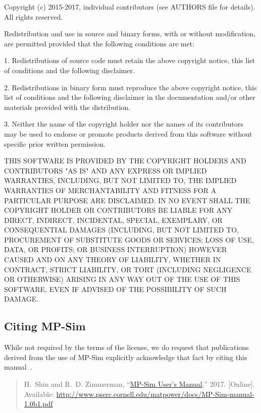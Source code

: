 \documentclass[12pt]{article}
\newcommand{\mpsim}[0]{{MP-Sim}}
\newcommand{\mpsimver}[0]{1.0b1}
\newcommand{\mpsimmanurl}[0]{http://www.pserc.cornell.edu/matpower/docs/MP-Sim-manual-\mpsimver.pdf}
\newcommand{\mpsimman}[0]{\href{\mpsimmanurl}{\mpsim{} User's Manual}}
\numberwithin{equation}{section}
\numberwithin{table}{section}
\numberwithin{figure}{section}
\begin{document}
\begin{Notice}
Copyright (c) 2015-2017, individual contributors (see AUTHORS file
for details).  All rights reserved.

Redistribution and use in source and binary forms, with or without
modification, are permitted provided that the following conditions
are met:

1. Redistributions of source code must retain the above copyright
notice, this list of conditions and the following disclaimer.

2. Redistributions in binary form must reproduce the above copyright
notice, this list of conditions and the following disclaimer in the
documentation and/or other materials provided with the distribution.

3. Neither the name of the copyright holder nor the names of its
contributors may be used to endorse or promote products derived from
this software without specific prior written permission.

THIS SOFTWARE IS PROVIDED BY THE COPYRIGHT HOLDERS AND CONTRIBUTORS
"AS IS" AND ANY EXPRESS OR IMPLIED WARRANTIES, INCLUDING, BUT NOT
LIMITED TO, THE IMPLIED WARRANTIES OF MERCHANTABILITY AND FITNESS
FOR A PARTICULAR PURPOSE ARE DISCLAIMED. IN NO EVENT SHALL THE
COPYRIGHT HOLDER OR CONTRIBUTORS BE LIABLE FOR ANY DIRECT, INDIRECT,
INCIDENTAL, SPECIAL, EXEMPLARY, OR CONSEQUENTIAL DAMAGES (INCLUDING,
BUT NOT LIMITED TO, PROCUREMENT OF SUBSTITUTE GOODS OR SERVICES;
LOSS OF USE, DATA, OR PROFITS; OR BUSINESS INTERRUPTION) HOWEVER
CAUSED AND ON ANY THEORY OF LIABILITY, WHETHER IN CONTRACT, STRICT
LIABILITY, OR TORT (INCLUDING NEGLIGENCE OR OTHERWISE) ARISING IN
ANY WAY OUT OF THE USE OF THIS SOFTWARE, EVEN IF ADVISED OF THE
POSSIBILITY OF SUCH DAMAGE.
\end{Notice}

\clearpage
\subsection{Citing \mpsim{}}

While not required by the terms of the license, we do request that publications derived from the use of \mpsim{} explicitly acknowledge that fact by citing
this manual~\cite{mpsim}.

\begin{quote}
\footnotesize
H.~Shin and R.~D. Zimmerman, ``\mpsimman{},'' 2017.
  [Online]. Available: \url{\mpsimmanurl}
\end{quote}
\end{document}
